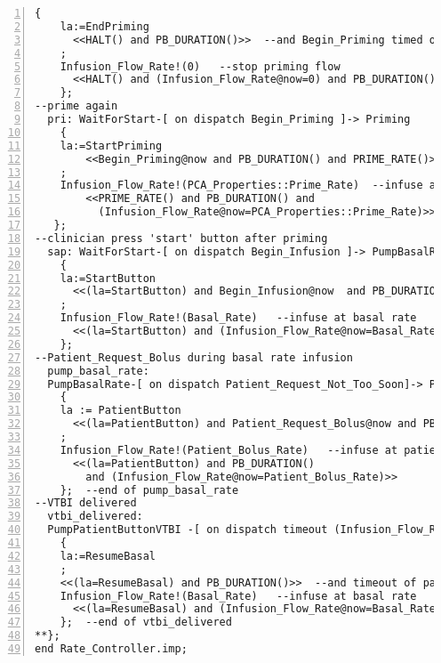 \begin{lstlisting}[language=aadl, gobble=0, numbers=left, caption={\lstinline{Rate_Controller} thread}, label={listing:aadl:rate_controller_thread}]
    {
    la:=EndPriming
      <<HALT() and PB_DURATION()>>  --and Begin_Priming timed out
    ;
    Infusion_Flow_Rate!(0)   --stop priming flow
      <<HALT() and (Infusion_Flow_Rate@now=0) and PB_DURATION()>>
    };
--prime again
  pri: WaitForStart-[ on dispatch Begin_Priming ]-> Priming  
    {
    la:=StartPriming
        <<Begin_Priming@now and PB_DURATION() and PRIME_RATE()>>
    ; 
    Infusion_Flow_Rate!(PCA_Properties::Prime_Rate)  --infuse at prime rate
        <<PRIME_RATE() and PB_DURATION() and
          (Infusion_Flow_Rate@now=PCA_Properties::Prime_Rate)>>   
   };
--clinician press 'start' button after priming    
  sap: WaitForStart-[ on dispatch Begin_Infusion ]-> PumpBasalRate  --start after priming
    {
    la:=StartButton
      <<(la=StartButton) and Begin_Infusion@now  and PB_DURATION()>>    
    ;
    Infusion_Flow_Rate!(Basal_Rate)   --infuse at basal rate
      <<(la=StartButton) and (Infusion_Flow_Rate@now=Basal_Rate@now) and PB_DURATION()>>
    };
--Patient_Request_Bolus during basal rate infusion
  pump_basal_rate: 
  PumpBasalRate-[ on dispatch Patient_Request_Not_Too_Soon]-> PumpPatientButtonVTBI
    {
    la := PatientButton 
      <<(la=PatientButton) and Patient_Request_Bolus@now and PB_DURATION()>>    
    ;
    Infusion_Flow_Rate!(Patient_Bolus_Rate)   --infuse at patient button rate
      <<(la=PatientButton) and PB_DURATION()
        and (Infusion_Flow_Rate@now=Patient_Bolus_Rate)>>     
    };  --end of pump_basal_rate
--VTBI delivered
  vtbi_delivered: 
  PumpPatientButtonVTBI -[ on dispatch timeout (Infusion_Flow_Rate) pb_duration ms ]-> PumpBasalRate
    {
    la:=ResumeBasal
    ;
    <<(la=ResumeBasal) and PB_DURATION()>>  --and timeout of patient button duration
    Infusion_Flow_Rate!(Basal_Rate)   --infuse at basal rate
      <<(la=ResumeBasal) and (Infusion_Flow_Rate@now=Basal_Rate@now) and PB_DURATION()>>   
    };  --end of vtbi_delivered
**};
end Rate_Controller.imp;
\end{lstlisting} 
\doublespacing
